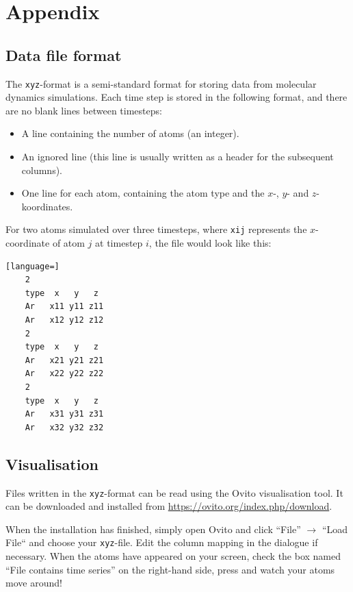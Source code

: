 \documentclass[11pt,british,a4paper]{report}
\renewcommand{\thesubsection}{\arabic{section}\alph{subsection})}
\begin{document}
\clearpage
\appendix
\section*{Appendix}
\setcounter{subsection}{0}
\renewcommand{\thesubsection}{\Alph{subsection}}

\subsection{Data file format}\label{app:xyz}
The \texttt{xyz}-format is a semi-standard format for storing data from molecular dynamics simulations. Each time step is stored in the following format, and there are no blank lines between timesteps:
\begin{itemize}
    \item A line containing the number of atoms (an integer).
    \item An ignored line (this line is usually written as a header for the subsequent columns).
    \item One line for each atom, containing the atom type and the \(x\)-, \(y\)- and \(z\)-koordinates.
\end{itemize}
For two atoms simulated over three timesteps, where \texttt{xij} represents the \(x\)-coordinate of atom \(j\) at timestep \(i\), the file would look like this:
\begin{lstlisting}[language=]
    2
    type  x   y   z
    Ar   x11 y11 z11
    Ar   x12 y12 z12
    2
    type  x   y   z
    Ar   x21 y21 z21
    Ar   x22 y22 z22
    2
    type  x   y   z
    Ar   x31 y31 z31
    Ar   x32 y32 z32
\end{lstlisting}


\tikzexternaldisable
\subsection{Visualisation}\label{app:ovito}
Files written in the \texttt{xyz}-format can be read using the Ovito visualisation tool. It can be downloaded and installed from \url{https://ovito.org/index.php/download}.

When the installation has finished, simply open Ovito and click ``File'' \(\to\) ``Load File`` and choose your \texttt{xyz}-file. Edit the column mapping in the dialogue if necessary. When the atoms have appeared on your screen, check the box named ``File contains time series'' on the right-hand side, press  and watch your atoms move around!
\end{document}
